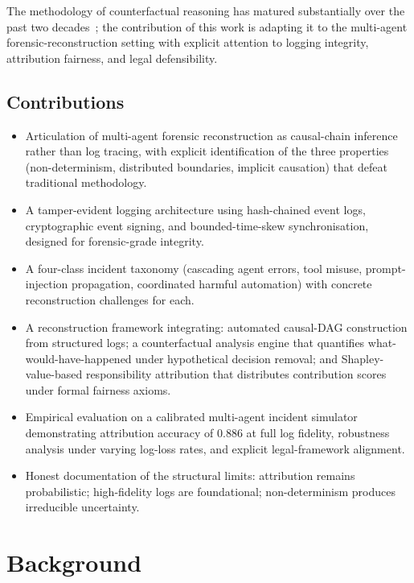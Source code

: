 \documentclass[sigconf,nonacm]{acmart}
\begin{document}
The methodology of counterfactual reasoning has matured
substantially over the past two decades~\cite{pearl2009causality,
peters2017elements}; the contribution of this work is adapting it to
the multi-agent forensic-reconstruction setting with explicit
attention to logging integrity, attribution fairness, and legal
defensibility.

\subsection{Contributions}

\begin{itemize}
  \item Articulation of multi-agent forensic reconstruction as
        causal-chain inference rather than log tracing, with explicit
        identification of the three properties (non-determinism,
        distributed boundaries, implicit causation) that defeat
        traditional methodology.
  \item A tamper-evident logging architecture using hash-chained
        event logs, cryptographic event signing, and bounded-time-skew
        synchronisation, designed for forensic-grade integrity.
  \item A four-class incident taxonomy (cascading agent errors,
        tool misuse, prompt-injection propagation, coordinated
        harmful automation) with concrete reconstruction
        challenges for each.
  \item A reconstruction framework integrating: automated causal-DAG
        construction from structured logs; a counterfactual analysis
        engine that quantifies what-would-have-happened under
        hypothetical decision removal; and Shapley-value-based
        responsibility attribution that distributes contribution
        scores under formal fairness axioms.
  \item Empirical evaluation on a calibrated multi-agent incident
        simulator demonstrating attribution accuracy of 0.886 at full
        log fidelity, robustness analysis under varying log-loss
        rates, and explicit legal-framework alignment.
  \item Honest documentation of the structural limits: attribution
        remains probabilistic; high-fidelity logs are foundational;
        non-determinism produces irreducible uncertainty.
\end{itemize}

\section{Background}
\end{document}

